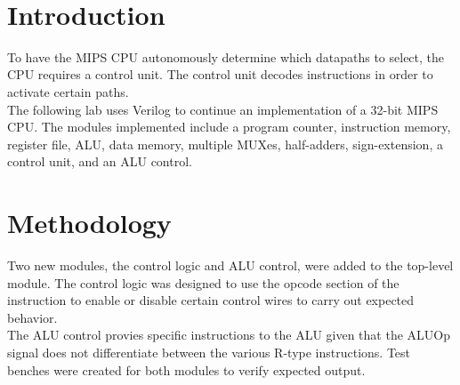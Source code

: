 \documentclass[twocolumn]{article}
\begin{document}
\

{\newpage}

\maketitle        


\section{Introduction}

To have the MIPS CPU autonomously determine which datapaths to select, the CPU requires a control unit. The control unit decodes instructions in order to activate certain paths.\\ 

The following lab uses Verilog to continue an implementation of a 32-bit MIPS CPU. The modules implemented include a program counter, instruction memory, register file, ALU, data memory, multiple MUXes, half-adders, sign-extension, a control unit, and an ALU control. 

\section{Methodology}

Two new modules, the control logic and ALU control, were added to the top-level module. The control logic was designed to use the opcode section of the instruction to enable or disable certain control wires to carry out expected behavior. \\ 

The ALU control provies specific instructions to the ALU given that the ALUOp signal does not differentiate between the various R-type instructions. Test benches were created for both modules to verify expected output. \\
\end{document}
